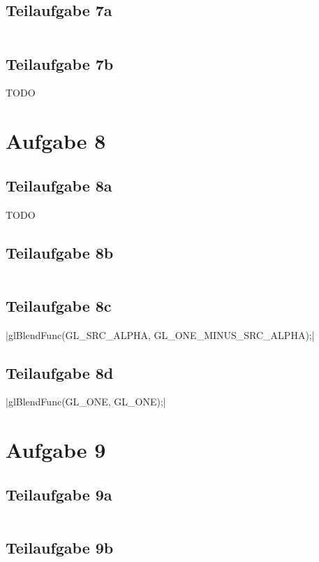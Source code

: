 \documentclass[a4paper]{scrartcl}
\begin{document}
\subsection*{Teilaufgabe 7a}
\inputminted[linenos, numbersep=5pt, tabsize=4, frame=lines, label=shader7a.frag, mathescape]{glsl}{shader7a.frag}

\subsection*{Teilaufgabe 7b}
TODO

\section*{Aufgabe 8}
\subsection*{Teilaufgabe 8a}
TODO

\subsection*{Teilaufgabe 8b}
\inputminted[linenos, numbersep=5pt, tabsize=4, frame=lines, label=blending.cpp]{cpp}{blending.cpp}

\subsection*{Teilaufgabe 8c}
|glBlendFunc(GL_SRC_ALPHA, GL_ONE_MINUS_SRC_ALPHA);|

\subsection*{Teilaufgabe 8d}
|glBlendFunc(GL_ONE, GL_ONE);|

\section*{Aufgabe 9}
\subsection*{Teilaufgabe 9a}
\inputminted[linenos, numbersep=5pt, tabsize=4, frame=lines, label=shader9a.frag]{glsl}{shader9a.frag}

\subsection*{Teilaufgabe 9b}
\inputminted[linenos, numbersep=5pt, tabsize=4, frame=lines, label=shader9b.frag]{glsl}{shader9b.frag}
\end{document}
